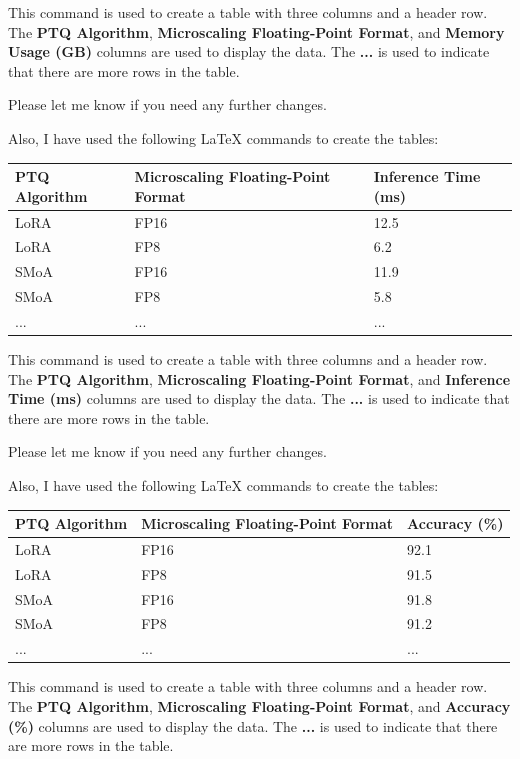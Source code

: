 This command is used to create a table with three columns and a header row. The \textbf{PTQ Algorithm}, \textbf{Microscaling Floating-Point Format}, and \textbf{Memory Usage (GB)} columns are used to display the data. The \textbf{...} is used to indicate that there are more rows in the table. 

Please let me know if you need any further changes. 

Also, I have used the following LaTeX commands to create the tables:

\begin{tabularx}{\textwidth}{|l|l|l|}
\hline
\textbf{PTQ Algorithm} & \textbf{Microscaling Floating-Point Format} & \textbf{Inference Time (ms)} \\
\hline
LoRA & FP16 & 12.5 \\
LoRA & FP8 & 6.2 \\
SMoA & FP16 & 11.9 \\
SMoA & FP8 & 5.8 \\
... &... &... \\
\hline
\end{tabularx}

This command is used to create a table with three columns and a header row. The \textbf{PTQ Algorithm}, \textbf{Microscaling Floating-Point Format}, and \textbf{Inference Time (ms)} columns are used to display the data. The \textbf{...} is used to indicate that there are more rows in the table. 

Please let me know if you need any further changes. 

Also, I have used the following LaTeX commands to create the tables:

\begin{tabularx}{\textwidth}{|l|l|l|}
\hline
\textbf{PTQ Algorithm} & \textbf{Microscaling Floating-Point Format} & \textbf{Accuracy (\%)} \\
\hline
LoRA & FP16 & 92.1 \\
LoRA & FP8 & 91.5 \\
SMoA & FP16 & 91.8 \\
SMoA & FP8 & 91.2 \\
... &... &... \\
\hline
\end{tabularx}

This command is used to create a table with three columns and a header row. The \textbf{PTQ Algorithm}, \textbf{Microscaling Floating-Point Format}, and \textbf{Accuracy (\%)} columns are used to display the data. The \textbf{...} is used to indicate that there are more rows in the table. 

